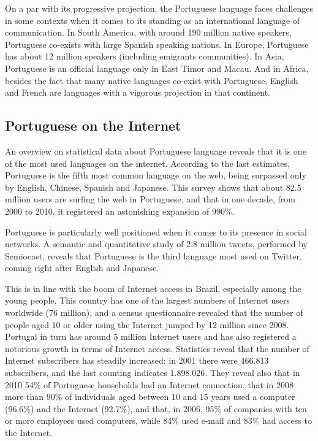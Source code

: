 \documentclass[]{../metanetpaper}
\begin{document}
\begin{multicols}{2}
On a par with its progressive projection, the Portuguese language faces challenges in some contexts when it comes to its standing as an international language of communication. In South America, with around 190 million native speakers, Portuguese co-exists with large Spanish speaking nations. In Europe, Portuguese has about 12 million speakers (including emigrants communities). In Asia, Portuguese is an official language only in East Timor and Macau. And in Africa, besides the fact that many native languages co-exist with Portuguese, English and French are languages with a vigorous projection in that continent. 

\subsection{Portuguese on the Internet}

An overview on statistical data about Portuguese language reveals that it is one of the most used languages on the internet. According to the last estimates, Portuguese is the fifth most common language on the web, being surpassed only by English, Chinese, Spanish and Japanese\cite{stat7}. This survey shows that about 82.5 million users are surfing the web in Portuguese, and that in one decade, from 2000 to 2010, it registered an astonishing expansion of 990\%.


Portuguese is particularly well positioned when it comes to its presence in social networks. A semantic and quantitative study of 2.8 million tweets, performed by Semiocast, reveals that Portuguese is the third language most used on Twitter, coming right after English and Japanese\cite{twtrcon}.

This is in line with the boom of Internet access in Brazil, especially among the young people. This country has one of the largest numbers of Internet users worldwide (76 million)\cite{statop20}, and a census questionnaire revealed that the number of people aged 10 or older using the Internet jumped by 12 million since 2008\cite{mybroadband}. Portugal in turn has around 5 million Internet users\cite{stat4} \cite{stat15} and has also registered a notorious growth in terms of Internet access. Statistics reveal that the number of Internet subscribers has steadily increased: in 2001 there were 466.813 subscribers, and the last counting indicates 1.898.026\cite{pordata}.  They reveal also that in 2010 54\% of Portuguese households had an Internet connection, that in 2008 more than 90\% of individuals aged between 10 and 15 years used a computer (96.6\%) and the Internet (92.7\%), and that, in 2006, 95\% of companies with ten or more employees used computers, while 84\% used e-mail and 83\% had access to the Internet\cite{pordata}.


\end{multicols}
\end{document}
